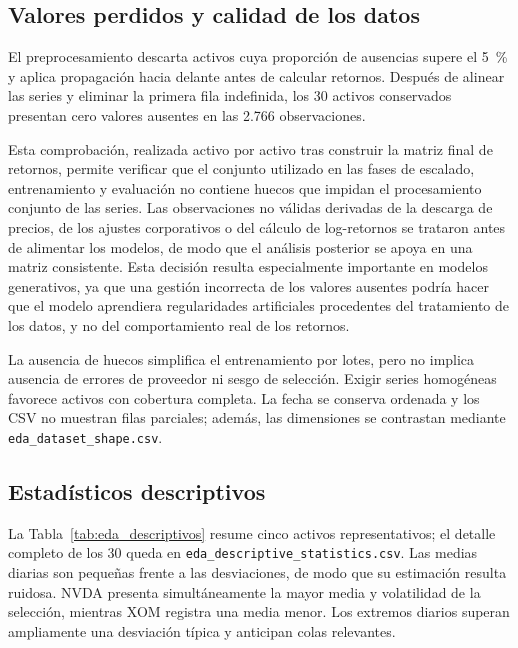 \subsection{Valores perdidos y calidad de los datos}
El preprocesamiento descarta activos cuya proporción de ausencias supere el 5~\% y aplica propagación hacia delante antes de calcular retornos. Después de alinear las series y eliminar la primera fila indefinida, los 30 activos conservados presentan cero valores ausentes en las 2.766 observaciones.

Esta comprobación, realizada activo por activo tras construir la matriz final de retornos, permite verificar que el conjunto utilizado en las fases de escalado, entrenamiento y evaluación no contiene huecos que impidan el procesamiento conjunto de las series. Las observaciones no válidas derivadas de la descarga de precios, de los ajustes corporativos o del cálculo de log-retornos se trataron antes de alimentar los modelos, de modo que el análisis posterior se apoya en una matriz consistente. Esta decisión resulta especialmente importante en modelos generativos, ya que una gestión incorrecta de los valores ausentes podría hacer que el modelo aprendiera regularidades artificiales procedentes del tratamiento de los datos, y no del comportamiento real de los retornos.

La ausencia de huecos simplifica el entrenamiento por lotes, pero no implica ausencia de errores de proveedor ni sesgo de selección. Exigir series homogéneas favorece activos con cobertura completa. La fecha se conserva ordenada y los CSV no muestran filas parciales; además, las dimensiones se contrastan mediante \texttt{eda\_dataset\_shape.csv}.

\subsection{Estadísticos descriptivos}
La Tabla~\ref{tab:eda_descriptivos} resume cinco activos representativos; el detalle completo de los 30 queda en \texttt{eda\_descriptive\_statistics.csv}. Las medias diarias son pequeñas frente a las desviaciones, de modo que su estimación resulta ruidosa. NVDA presenta simultáneamente la mayor media y volatilidad de la selección, mientras XOM registra una media menor. Los extremos diarios superan ampliamente una desviación típica y anticipan colas relevantes.

